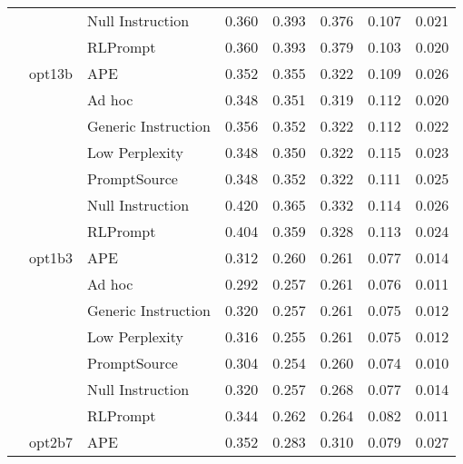 \begin{supertabular}{lllrrrrr}
              &        & Null Instruction &            0.360 &           0.393 &          0.376 &        0.107 &    0.021 \\
              &        & RLPrompt &            0.360 &           0.393 &          0.379 &        0.103 &    0.020 \\
              & opt13b & APE &            0.352 &           0.355 &          0.322 &        0.109 &    0.026 \\
              &        & Ad hoc &            0.348 &           0.351 &          0.319 &        0.112 &    0.020 \\
              &        & Generic Instruction &            0.356 &           0.352 &          0.322 &        0.112 &    0.022 \\
              &        & Low Perplexity &            0.348 &           0.350 &          0.322 &        0.115 &    0.023 \\
              &        & PromptSource &            0.348 &           0.352 &          0.322 &        0.111 &    0.025 \\
              &        & Null Instruction &            0.420 &           0.365 &          0.332 &        0.114 &    0.026 \\
              &        & RLPrompt &            0.404 &           0.359 &          0.328 &        0.113 &    0.024 \\
              & opt1b3 & APE &            0.312 &           0.260 &          0.261 &        0.077 &    0.014 \\
              &        & Ad hoc &            0.292 &           0.257 &          0.261 &        0.076 &    0.011 \\
              &        & Generic Instruction &            0.320 &           0.257 &          0.261 &        0.075 &    0.012 \\
              &        & Low Perplexity &            0.316 &           0.255 &          0.261 &        0.075 &    0.012 \\
              &        & PromptSource &            0.304 &           0.254 &          0.260 &        0.074 &    0.010 \\
              &        & Null Instruction &            0.320 &           0.257 &          0.268 &        0.077 &    0.014 \\
              &        & RLPrompt &            0.344 &           0.262 &          0.264 &        0.082 &    0.011 \\
              & opt2b7 & APE &            0.352 &           0.283 &          0.310 &        0.079 &    0.027 \\

\end{supertabular}
